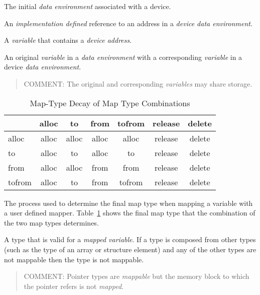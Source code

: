 \glossarydefstart
The initial \emph{data environment} associated with a device.
\glossarydefend
\bigskip

\glossarydefstart
An \emph{implementation defined} reference to an address in a 
\emph{device data environment}.
\glossarydefend

\glossarydefstart
A \emph{variable} that contains a \emph{device address}.
\glossarydefend


\glossarydefstart
An original \emph{variable} in a \emph{data environment} with a corresponding 
\emph{variable} in a device \emph{data environment}.

\begin{quote}
COMMENT: The original and corresponding \emph{variables} may share storage.
\end{quote}
\glossarydefend

\begin{table}[b]
\centering
\caption{Map-Type Decay of Map Type Combinations\label{tab:map-type_decay}}
\begin{tabular}{l|c|c|c|c|c|c}
  & alloc & to    & from  & tofrom & release & delete \\
  \hline
alloc  & alloc & alloc & alloc & alloc  & release & delete \\
to     & alloc & to    & alloc & to     & release & delete \\
from   & alloc & alloc & from  & from   & release & delete \\
tofrom & alloc & to    & from  & tofrom & release & delete \\
\end{tabular}
\end{table}

\glossarydefstart
The process used to determine the final map type when mapping a variable
with a user defined mapper. Table~\ref{tab:map-type_decay} shows the final 
map type that the combination of the two map types determines.
\glossarydefend

\glossarydefstart
A type that is valid for a \emph{mapped variable}. If a type is composed 
from other types (such as the type of an array or structure element) and 
any of the other types are not mappable then the type is not mappable.

\begin{quote}
COMMENT: Pointer types are \emph{mappable} but the memory block to which 
the pointer refers is not \emph{mapped}.
\end{quote}

